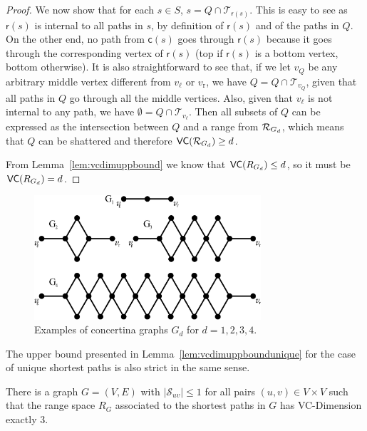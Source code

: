 \begin{proof}
  We now show that for each $s\in S$, $s=Q\cap\mathcal{T}_{\mathsf{r}(s)}$. This
  is easy to see as $\mathsf{r}(s)$ is internal to all paths in $s$, by
  definition of $\mathsf{r}(s)$ and of the paths in $Q$. On the other end, no
  path from $\mathsf{c}(s)$ goes through $\mathsf{r}(s)$ because it goes through
  the corresponding vertex of $\mathsf{r}(s)$ (top if $\mathsf{r}(s)$ is a
  bottom vertex, bottom otherwise). It is also straightforward to see that,
  if we let $v_Q$ be any arbitrary middle vertex different from $v_\ell$
  or $v_\mathrm{r}$, we have $Q=Q\cap\mathcal{T}_{v_Q}$, given that all paths in
  $Q$ go through all the middle vertices. Also, given that $v_\ell$ is not
  internal to any path, we have $\emptyset=Q\cap\mathcal{T}_{v_\ell}$. Then all
  subsets of $Q$ can be expressed as the intersection between $Q$ and a range
  from $\mathcal{R}_{G_d}$, which means that $Q$ can be shattered and therefore
  $\mathsf{VC}(\mathcal{R}_{G_d})\ge d$.

  From Lemma~\ref{lem:vcdimuppbound} we know that $\mathsf{VC}(R_{G_d})\le d$, so
  it must be $\mathsf{VC}(R_{G_d})=d$.
\end{proof}

\begin{figure}[th]
  \centering
  \includegraphics[width=0.75\textwidth,keepaspectratio]{centrsampl/figures/eps/tight}
  \caption{Examples of concertina graphs $G_d$ for $d=1,2,3,4$.}
  \label{fig:centrsampltightgraphs}
\end{figure}

The upper bound presented in Lemma~\ref{lem:vcdimuppboundunique}  for the case
of unique shortest paths is also strict in the same sense.

\begin{lemma}\label{lem:vcdimlowboundunique}
  There is a graph $G=(V,E)$ with $|\mathcal{S}_{uv}|\le1$ for all
  pairs $(u,v)\in V\times V$ such that the range space $R_G$ associated to the
  shortest paths in $G$ has VC-Dimension exactly $3$.
\end{lemma}

